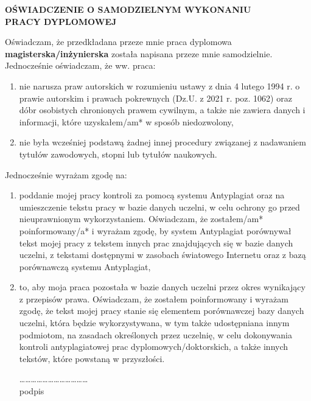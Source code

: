 \begingroup
\begin{small}
\begin{center}
     \large  \textbf{ OŚWIADCZENIE O SAMODZIELNYM WYKONANIU \\ PRACY DYPLOMOWEJ}
\end{center}

Oświadczam, że przedkładana przeze mnie praca dyplomowa \textbf{magisterska/inżynierska} została napisana przeze mnie samodzielnie. Jednocześnie oświadczam, że ww. praca: 
\begin{enumerate}
\item nie narusza praw autorskich w rozumieniu ustawy z dnia 4 lutego 1994 r. o prawie autorskim i prawach pokrewnych (Dz.U. z 2021 r. poz. 1062) oraz dóbr osobistych chronionych prawem cywilnym, a także nie zawiera danych i informacji, które uzyskałem/am* w sposób niedozwolony,
\item nie była wcześniej podstawą żadnej innej procedury związanej z nadawaniem tytułów zawodowych, stopni lub tytułów naukowych.

\end{enumerate}

Jednocześnie wyrażam zgodę na:


\begin{enumerate}

\item poddanie mojej pracy kontroli za pomocą systemu Antyplagiat oraz na umieszczenie tekstu pracy w bazie danych uczelni, w celu ochrony go przed nieuprawnionym wykorzystaniem. Oświadczam, że zostałem/am* poinformowany/a* i wyrażam zgodę, by system Antyplagiat porównywał tekst mojej pracy z tekstem innych prac znajdujących się w bazie danych uczelni, z tekstami dostępnymi w zasobach światowego Internetu oraz z bazą porównawczą systemu Antyplagiat,
\item to, aby moja praca pozostała w bazie danych uczelni przez okres wynikający z przepisów prawa. Oświadczam, że zostałem poinformowany i wyrażam zgodę, że tekst mojej pracy stanie się elementem porównawczej bazy danych uczelni, która będzie wykorzystywana, w tym także udostępniana innym podmiotom, na zasadach określonych przez uczelnię, w celu dokonywania kontroli antyplagiatowej prac dyplomowych/doktorskich, a także innych tekstów, które powstaną w przyszłości.



\begin{flushright}
……………………………… \\
podpis
\end{flushright}



\end{enumerate}
\end{small}
